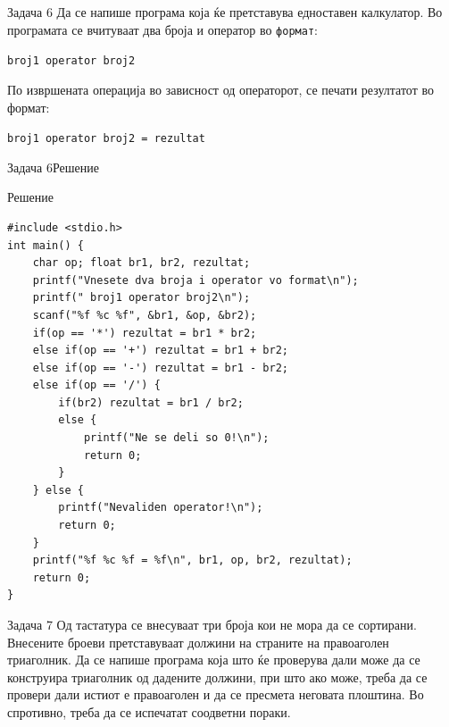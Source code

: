 \begin{frame}[fragile]{Задача 6}
Да се напише програма која ќе претставува едноставен калкулатор. Во програмата
се вчитуваат два броја и оператор во \texttt{формат}:
\begin{center}
\texttt{broj1 operator broj2}
\end{center}
По извршената операција во зависност од операторот, се печати резултатот во формат:
\begin{center}
\texttt{broj1 operator broj2 = rezultat}
\end{center}
\end{frame}

\begin{frame}[fragile,shrink=10]{Задача 6}{Решение}
    \begin{exampleblock}{Решение}
\begin{lstlisting}
#include <stdio.h>
int main() {
    char op; float br1, br2, rezultat;
    printf("Vnesete dva broja i operator vo format\n");
    printf(" broj1 operator broj2\n");
    scanf("%f %c %f", &br1, &op, &br2);
    if(op == '*') rezultat = br1 * br2;
    else if(op == '+') rezultat = br1 + br2;
    else if(op == '-') rezultat = br1 - br2;
    else if(op == '/') {
        if(br2) rezultat = br1 / br2;
        else {
            printf("Ne se deli so 0!\n");
            return 0;
        }
    } else {
        printf("Nevaliden operator!\n");
        return 0;
    }
    printf("%f %c %f = %f\n", br1, op, br2, rezultat);
    return 0;
}
        \end{lstlisting}
    \end{exampleblock}
\end{frame}


\begin{frame}[fragile]{Задача 7}
Од тастатура се внесуваат три броја кои не мора да се сортирани. Внесените броеви претставуваат должини на страните на правоаголен триаголник. Да се напише програма која што ќе проверува дали може да се конструира триаголник од дадените должини, при што ако може, треба да се провери дали истиот е правоаголен и да се пресмета неговата плоштина. Во спротивно, треба да се испечатат соодветни пораки.
\end{frame}


